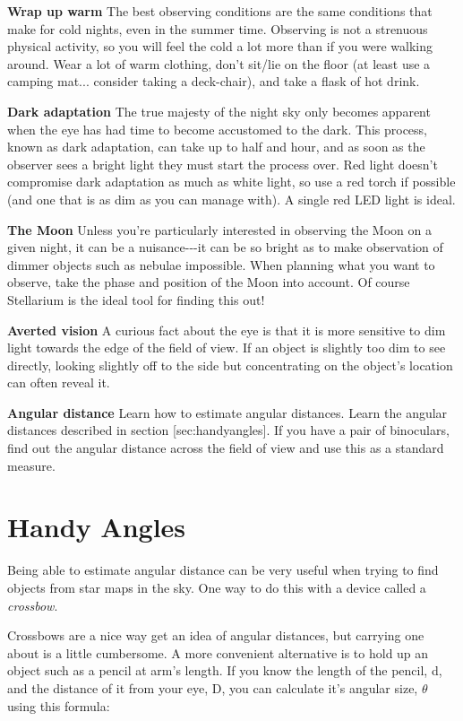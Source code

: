 \textbf{Wrap up warm} The best observing conditions are the same
conditions that make for cold nights, even in the summer time. Observing
is not a strenuous physical activity, so you will feel the cold a lot
more than if you were walking around. Wear a lot of warm clothing, don't
sit/lie on the floor (at least use a camping mat... consider taking a
deck-chair), and take a flask of hot drink.

\textbf{Dark adaptation} The true majesty of the night sky only becomes
apparent when the eye has had time to become accustomed to the dark.
This process, known as dark adaptation, can take up to half and hour,
and as soon as the observer sees a bright light they must start the
process over. Red light doesn't compromise dark adaptation as much as
white light, so use a red torch if possible (and one that is as dim as
you can manage with). A single red LED light is ideal.

\textbf{The Moon} Unless you're particularly interested in observing the
Moon on a given night, it can be a nuisance-\/-\/-it can be so bright as
to make observation of dimmer objects such as nebulae impossible. When
planning what you want to observe, take the phase and position of the
Moon into account. Of course Stellarium is the ideal tool for finding
this out!

\textbf{Averted vision} A curious fact about the eye is that it is more
sensitive to dim light towards the edge of the field of view. If an
object is slightly too dim to see directly, looking slightly off to the
side but concentrating on the object's location can often reveal it.

\textbf{Angular distance} Learn how to estimate angular distances. Learn
the angular distances described in section {[}sec:handyangles{]}. If you
have a pair of binoculars, find out the angular distance across the
field of view and use this as a standard measure.

\section{Handy Angles}\label{handy-angles}

Being able to estimate angular distance can be very useful when trying
to find objects from star maps in the sky. One way to do this with a
device called a \emph{crossbow}.

Crossbows are a nice way get an idea of angular distances, but carrying
one about is a little cumbersome. A more convenient alternative is to
hold up an object such as a pencil at arm's length. If you know the
length of the pencil, d, and the distance of it from your eye, D, you
can calculate it's angular size, $\theta$ using this formula:

